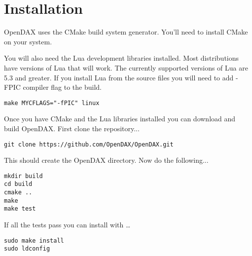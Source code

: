 \section{Installation}

OpenDAX uses the CMake build system generator.  You'll need to install CMake
on your system.

You will also need the Lua development libraries installed.  Most 
distributions have versions of Lua that will work.  The currently supported
versions of Lua are 5.3 and greater.
If you install Lua from the source files you will need to add -FPIC 
compiler flag to the build.

\begin{verbatim}
make MYCFLAGS="-fPIC" linux
\end{verbatim}

Once you have CMake and the Lua libraries installed you can download and build
OpenDAX.  First clone the repository...

\begin{verbatim}
git clone https://github.com/OpenDAX/OpenDAX.git
\end{verbatim}

This should create the OpenDAX directory.  Now do the following...
\begin{verbatim}
mkdir build
cd build
cmake ..
make
make test
\end{verbatim}

If all the tests pass you can install with \ldots

\begin{verbatim}
sudo make install
sudo ldconfig
\end{verbatim}
